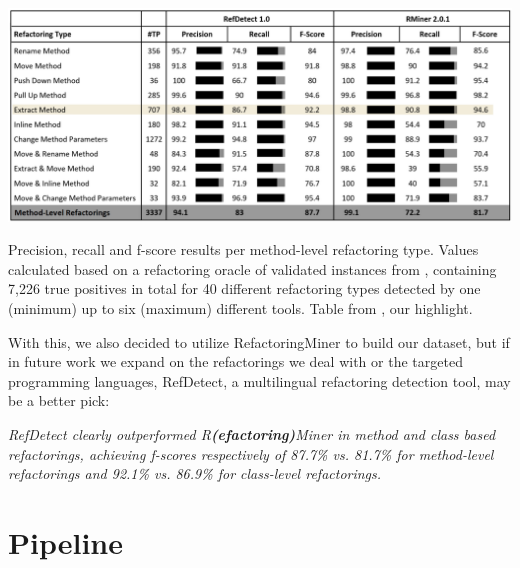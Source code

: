 \begin{table}[!ht]
\centerline{\includegraphics[width=\textwidth]{figuras/tabela_refdetect_refacminer.png}   }
\caption{Precision, recall and f-score results per method-level refactoring type. Values calculated based on a refactoring
oracle of validated instances from \citet{refactoringminer_2.0}, containing 7,226 true
positives in total for 40 different refactoring types detected
by one (minimum) up to six (maximum) different tools. Table from \citet{moghadam2021refdetect}, our highlight.}
\label{img:tabela_refdetect_refacminer}
\end{table}


With this, we also decided to utilize RefactoringMiner to build our dataset, but if in future work we expand on the refactorings we deal with or the targeted programming languages, RefDetect, a multilingual refactoring detection tool, may be a better pick:  

\begin{myquote}
\textit{RefDetect clearly outperformed R\textbf{(efactoring)}Miner in method and class based refactorings, achieving f-scores respectively of 87.7\% vs. 81.7\% for method-level refactorings and 92.1\% vs. 86.9\% for class-level refactorings.}
\\\citet{moghadam2021refdetect}
\end{myquote}


\section{Pipeline}

